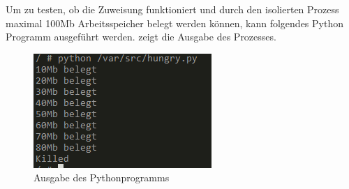 Um zu testen, ob die Zuweisung funktioniert und durch den isolierten Prozess maximal 100Mb Arbeitsspeicher belegt werden können, kann folgendes Python Programm ausgeführt werden.  zeigt die Ausgabe des Prozesses.


\begin{figure}[h]
	 \begin{center}
	 	\includegraphics[scale=1]{bilder/cgroup-container-killed.png}
	 	\caption{Ausgabe des Pythonprogramms}
	 	\label{fig:cgroupKilled}
	 \end{center}
\end{figure}